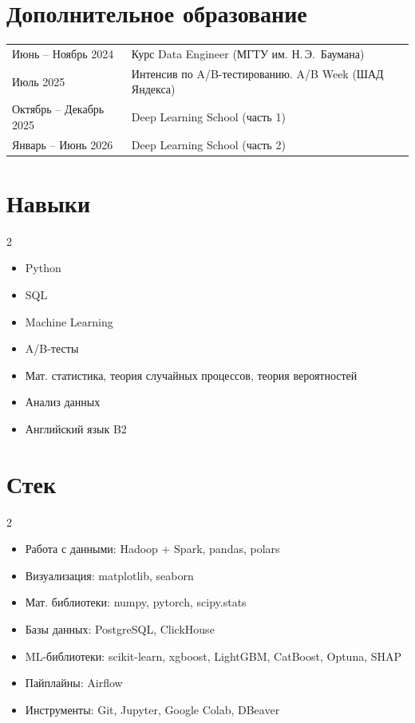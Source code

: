 \documentclass[a4paper,11pt]{article}
\begin{document}
	\section{Дополнительное образование}
	\begin{tabularx}{\linewidth}{@{}l X@{}}
		Июнь -- Ноябрь 2024     & Курс Data Engineer (МГТУ им. Н.\,Э.~Баумана) \\
		Июль 2025               & Интенсив по A/B-тестированию. A/B Week (ШАД Яндекса) \\
		Октябрь -- Декабрь 2025 & Deep Learning School (часть 1) \\
		Январь -- Июнь 2026     & Deep Learning School (часть 2) \\
	\end{tabularx}
	
	\section{Навыки}
	\begin{multicols}{2}
		\raggedright
		\begin{itemize}
			\item Python
			\item SQL
			\item Machine Learning
			\item A/B-тесты
			\item Мат. статистика, теория случайных процессов, теория вероятностей
			\item Анализ данных
			\item Английский язык B2
		\end{itemize}
	\end{multicols}
	
	\section{Стек}
	\begin{multicols}{2}
		\raggedright
		\begin{itemize}
			\item Работа с данными: Hadoop + Spark, pandas, polars
			\item Визуализация: matplotlib, seaborn
			\item Мат. библиотеки: numpy, pytorch, scipy.stats
			\item Базы данных: PostgreSQL, ClickHouse
			\item ML-библиотеки: scikit-learn, xgboost, LightGBM, CatBoost, Optuna, SHAP
			\item Пайплайны: Airflow
			\item Инструменты: Git, Jupyter, Google Colab, DBeaver
		\end{itemize}
	\end{multicols}

	
\end{document}
